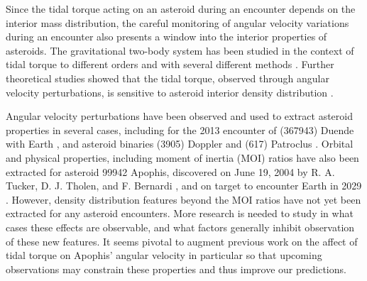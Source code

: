 \documentclass[fleqn,usenatbib]{mnras}
\begin{document}
Since the tidal torque acting on an asteroid during an encounter depends on the interior mass distribution, the careful monitoring of angular velocity variations during an encounter also presents a window into the interior properties of asteroids. The gravitational two-body system has been studied in the context of tidal torque to different orders and with several different methods \citep{paul88, SCHEERES2000106, ashenberg07, BOUE2009750, HouMar2017}. Further theoretical studies showed that the tidal torque, observed through angular velocity perturbations, is sensitive to asteroid interior density distribution \citep{Naidu_2015, Makarov2022ChaosOO, scheeres2004evolution}.

Angular velocity perturbations have been observed and used to extract asteroid properties in several cases, including for the 2013 encounter of (367943) Duende with Earth \citep{MOSKOVITZ2020113519, benson2020spin}, and asteroid binaries (3905) Doppler and (617) Patroclus \citep{DESCAMPS2020113726, BERTHIER2020113990}. Orbital and physical properties, including moment of inertia (MOI) ratios have also been extracted for asteroid 99942 Apophis, discovered on June 19, 2004 by R. A. Tucker, D. J. Tholen, and F. Bernardi \citep{giorgini2005recent, giorgini2008predicting, smalley20052004}, and on target to encounter Earth in 2029 \citep{yu2014numerical, hirabayashi2021finite, valvano2022apophis, Lee2022Apophis}. However, density distribution features beyond the MOI ratios have not yet been extracted for any asteroid encounters. More research is needed to study in what cases these effects are observable, and what factors generally inhibit observation of these new features. It seems pivotal to augment previous work on the affect of tidal torque on Apophis' angular velocity in particular \citep{souchay2014rotational, souchay2018changes} so that upcoming observations may constrain these properties and thus improve our predictions.
\end{document}
